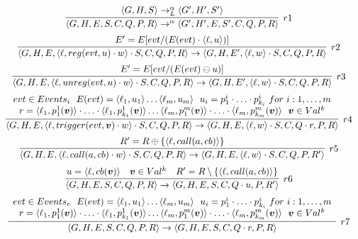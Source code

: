\begin{figure}[t]
{
\footnotesize
$$
\begin{array}{c}
\infer[r1]
{\tuple{G,H,E,S,C,Q,P,R}\rightarrow^{\alpha}\tuple{G',H',E,S',C,Q,P,R}}
{\tuple{G,H,S}\rightarrow_L^\alpha\tuple{G',H',S'}}
\medskip\\
\infer[r2]
{\tuple{G,H,E,\tuple{\ell,reg(evt,u)\cdot w}\cdot S,C,Q,P,R}\rightarrow
 \tuple{G,H,E',\tuple{\ell,w}\cdot S,C,Q,P,R}}
{E'=E[evt/(E(evt)\cdot \tuple{\ell,u})]}
\medskip\\
\infer[r3]{
\tuple{G,H,E,\tuple{\ell,unreg(evt,u)\cdot w}\cdot S,C,Q,P,R}\rightarrow
\tuple{G,H,E',\tuple{\ell,w}\cdot S,C,Q,P,R}}
{E'=E[evt/(E(evt)\ominus u)]}
\medskip\\
\infer[r4]{
\tuple{G,H,E,\tuple{\ell,trigger(evt,\vec{v})\cdot w}\cdot S,C,Q,P,R}\rightarrow
\tuple{G,H,E,\tuple{\ell,w}\cdot S,C,Q\cdot r,P,R}}
{\begin{array}{c}
evt\in Events_i 
\ \ 
E(evt)=\tuple{\ell_1,u_1}\ldots\tuple{\ell_m,u_m}
\ \
u_i=p_1^i\cdot\ldots\cdot p_{k_i}^i\ for\ i:1,\ldots,m
\\
r=\tuple{\ell_1,p_1^1(\vec{v})}\cdot \ldots\cdot \tuple{\ell_1,p_{k_1}^1(\vec{v})} 
\ldots
\tuple{\ell_m,p_1^m(\vec{v})}\cdot \ldots\cdot \tuple{\ell_m,p_{k_m}^m(\vec{v})} 
\ \ 
\vec{v}\in Val^k
\end{array}
}
\medskip\\
\infer[r5]{
\tuple{G,H,E,\tuple{\ell,call(a,cb)\cdot w}\cdot S,C,Q,P,R}\rightarrow
\tuple{G,H,E,\tuple{\ell,w}\cdot S,C,Q,P,R'}}
{R'=R\oplus\{\tuple{\ell,call(a,cb)}\}}
\medskip\\
\infer[r6]{
\tuple{G,H,E,S,C,Q,P,R}\rightarrow
\tuple{G,H,E,S,C,Q\cdot u,P,R'}}
{u=\tuple{\ell,cb(\vec{v})} & \vec{v}\in Val^k & R'=R\setminus\{\tuple{\ell,call(a,cb)}\}}
\medskip\\
\infer[r7]{
\tuple{G,H,E,S,C,Q,P,R}\rightarrow 
\tuple{G,H,E,S,C,Q\cdot r,P,R}}
{\begin{array}{c}
evt\in Events_e
\ \ 
E(evt)=\tuple{\ell_1,u_1}\ldots\tuple{\ell_m,u_m}
\ \
u_i=p_1^i\cdot\ldots\cdot p_{k_i}^i\ for\ i:1,\ldots,m
\\
r=\tuple{\ell_1,p_1^1(\vec{v})}\cdot \ldots\cdot \tuple{\ell_1,p_{k_1}^1(\vec{v})} 
\ldots
\tuple{\ell_m,p_1^m(\vec{v})}\cdot \ldots\cdot \tuple{\ell_m,p_{k_m}^m(\vec{v})} 
\ \ 
\vec{v}\in Val^k
\end{array}
}
\medskip\\

\end{array}$$}
\end{figure}
